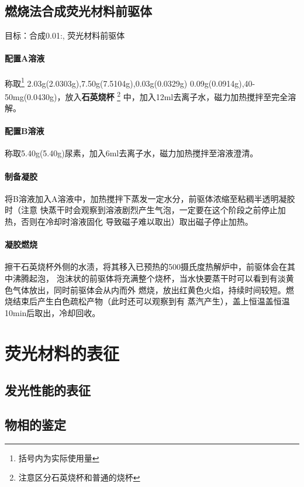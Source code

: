 \documentclass[a4paper,zihao=5,UTF8]{ctexart}
\begin{document}
	\subsection{燃烧法合成荧光材料前驱体}
	目标：合成0.01:,
	荧光材料前驱体
	\paragraph{配置A溶液}
	称取\footnote{括号内为实际使用量}
	2.03g(2.0303g),7.50g(7.5104g),0.03g(0.0329g)
	0.09g(0.0914g),40-50mg(0.0430g)，放入\textbf{石英烧杯}
	\footnote{注意区分石英烧杯和普通的烧杯}
	中，加入12ml去离子水，磁力加热搅拌至完全溶解。
	\paragraph{配置B溶液}
	称取5.40g(5.40g)尿素，加入6ml去离子水，磁力加热搅拌至溶液澄清。
	\paragraph{制备凝胶}
	将B溶液加入A溶液中，加热搅拌下蒸发一定水分，前驱体浓缩至粘稠半透明凝胶时（注意
	快蒸干时会观察到溶液剧烈产生气泡，一定要在这个阶段之前停止加热，否则在冷却时溶液固化
	导致磁子难以取出）取出磁子停止加热。
	\paragraph{凝胶燃烧}
	擦干石英烧杯外侧的水渍，将其移入已预热的500摄氏度热解炉中，前驱体会在其中沸腾起泡，
	泡沫状的前驱体将充满整个烧杯，当水快要蒸干时可以看到有淡黄色气体放出，同时前驱体会从内而外
	燃烧，放出红黄色火焰，持续时间较短。燃烧结束后产生白色疏松产物（此时还可以观察到有
	蒸汽产生），盖上恒温盖恒温10min后取出，冷却回收。
	\section{荧光材料的表征}
	\subsection{发光性能的表征}
	\subsection{物相的鉴定}

	
	
	
\end{document}
